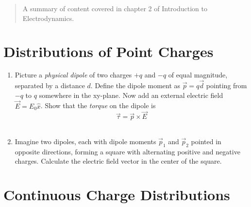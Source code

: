 \documentclass[10pt]{article}
\begin{document}
\maketitle

\begin{abstract}
A summary of content covered in chapter 2 of Introduction to Electrodynamics. 
\end{abstract}
\noindent

\section{Distributions of Point Charges}

\begin{enumerate}
\item Picture a \textit{physical dipole} of two charges $+q$ and $-q$ of equal magnitude, separated by a distance $d$.  Define the dipole moment as $\vec{p} = q\vec{d}$ pointing from $-q$ to $q$ somewhere in the xy-plane.  Now add an external electric field $\vec{E} = E_0 \hat{x}$.  Show that the \textit{torque} on the dipole is 
\begin{equation}
\vec{\tau} = \vec{p} \times \vec{E}
\end{equation} \\ \vspace{3cm}
\item Imagine two dipoles, each with dipole moments $\vec{p}_1$ and $\vec{p}_2$ pointed in opposite directions, forming a square with alternating positive and negative charges.  Calculate the electric field vector in the center of the square. \\ \vspace{3cm}
\end{enumerate}

\section{Continuous Charge Distributions}
\end{document}

